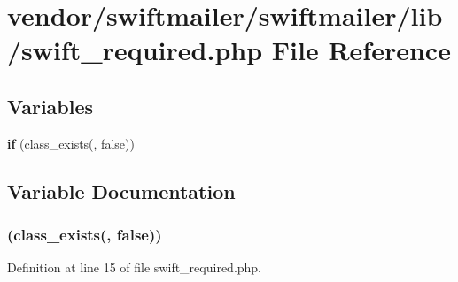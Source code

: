 \section{vendor/swiftmailer/swiftmailer/lib/swift\+\_\+required.php File Reference}
\label{swift__required_8php}
\subsection*{Variables}
\begin{DoxyCompactItemize}
\item 
{\bf if} (class\+\_\+exists(\textquotesingle{}, false))
\end{DoxyCompactItemize}


\subsection{Variable Documentation}
\subsubsection[{if}]{(class\+\_\+exists(\textquotesingle{}, false))}\label{swift__required_8php_a9bbddb0c78d1af5ebb173ab7194d6df6}


Definition at line 15 of file swift\+\_\+required.\+php.

